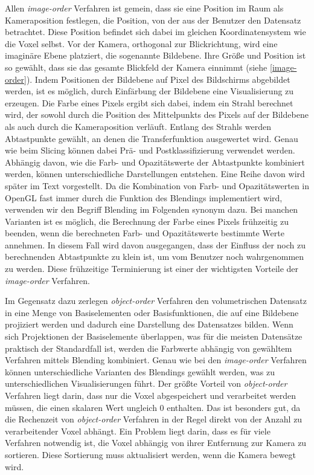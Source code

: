 \documentclass[a4paper,fontsize=12pt,toc=bib,parskip=half,ngerman]{scrartcl}
\begin{document}
Allen \textit{image-order} Verfahren ist gemein, dass sie eine Position im Raum als \glq Kameraposition\grq{} festlegen, die Position, von der aus der Benutzer den Datensatz betrachtet. Diese Position befindet sich dabei im gleichen Koordinatensystem wie die Voxel selbst. Vor der Kamera, orthogonal zur Blickrichtung, wird eine imagin\"are Ebene platziert, die sogenannte Bildebene. Ihre Gr\"o{\ss}e und Position ist so gew\"ahlt, dass sie das gesamte Blickfeld der Kamera einnimmt (siehe \cref{image-order}). Indem Positionen der Bildebene auf Pixel des Bildschirms abgebildet werden, ist es m\"oglich, durch Einf\"arbung der Bildebene eine Visualisierung zu erzeugen. Die Farbe eines Pixels ergibt sich dabei, indem ein Strahl berechnet wird, der sowohl durch die Position des Mittelpunkts des Pixels auf der Bildebene als auch durch die Kameraposition verl\"auft. Entlang des Strahls werden Abtastpunkte gew\"ahlt, an denen die Transferfunktion ausgewertet wird. Genau wie beim Slicing k\"onnen dabei Pr\"a- und Postklassifizierung verwendet werden. Abh\"angig davon, wie die Farb- und Opazit\"atswerte der Abtastpunkte kombiniert werden, k\"onnen unterschiedliche Darstellungen entstehen. Eine Reihe davon wird sp\"ater im Text vorgestellt. Da die Kombination von Farb- und Opazit\"atswerten in OpenGL fast immer durch die Funktion des Blendings implementiert wird, verwenden wir den Begriff \glq Blending\grq{} im Folgenden synonym dazu. Bei manchen Varianten ist es m\"oglich, die Berechnung der Farbe eines Pixels fr\"uhzeitig zu beenden, wenn die berechneten Farb- und Opazit\"atswerte bestimmte Werte annehmen. In diesem Fall wird davon ausgegangen, dass der Einfluss der noch zu berechnenden Abtastpunkte zu klein ist, um vom Benutzer noch wahrgenommen zu werden. Diese fr\"uhzeitige Terminierung ist einer der wichtigsten Vorteile der \textit{image-order} Verfahren. 

Im Gegensatz dazu zerlegen \textit{object-order} Verfahren den volumetrischen Datensatz in eine Menge von Basiselementen oder Basisfunktionen, die auf eine Bildebene projiziert werden und dadurch eine Darstellung des Datensatzes bilden. Wenn sich Projektionen der Basiselemente \"uberlappen, was f\"ur die meisten Datens\"atze praktisch der Standardfall ist, werden die Farbwerte abh\"angig von gew\"ahltem Verfahren mittels Blending kombiniert. Genau wie bei den \textit{image-order} Verfahren k\"onnen unterschiedliche Varianten des Blendings gew\"ahlt werden, was zu unterschiedlichen Visualisierungen f\"uhrt. Der gr\"o{\ss}te Vorteil von \textit{object-order} Verfahren liegt darin, dass nur die Voxel abgespeichert und verarbeitet werden m\"ussen, die einen skalaren Wert ungleich 0 enthalten. Das ist besonders gut, da die Rechenzeit von \textit{object-order} Verfahren in der Regel direkt von der Anzahl zu verarbeitender Voxel abh\"angt. Ein Problem liegt darin, dass es f\"ur viele Verfahren notwendig ist, die Voxel abh\"angig von ihrer Entfernung zur Kamera zu sortieren. Diese Sortierung muss aktualisiert werden, wenn die Kamera bewegt wird.
\end{document}

